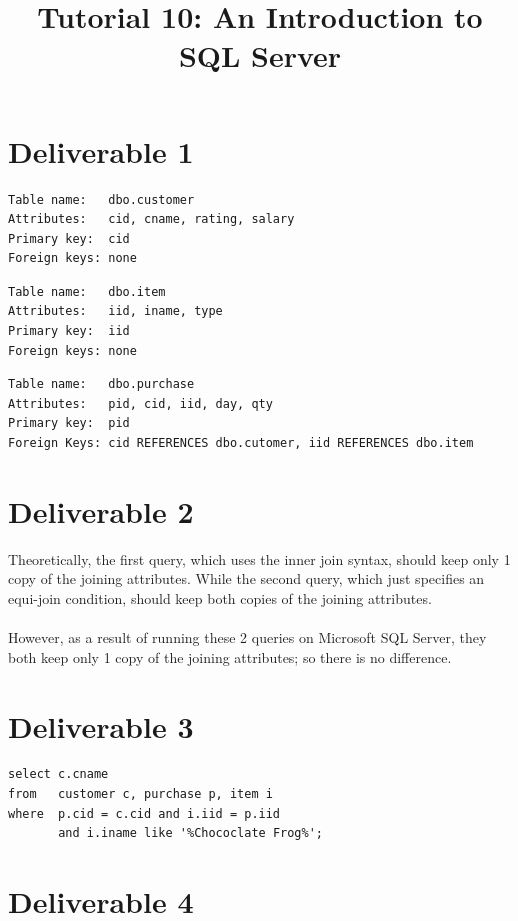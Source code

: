 \documentclass{article}
\title{Tutorial 10: An Introduction to SQL Server}
\begin{document}
	\maketitle

\section{Deliverable 1}

\begin{verbatim}
Table name:   dbo.customer
Attributes:   cid, cname, rating, salary
Primary key:  cid
Foreign keys: none
\end{verbatim}

\begin{verbatim}
Table name:   dbo.item
Attributes:   iid, iname, type
Primary key:  iid
Foreign keys: none
\end{verbatim}

\begin{verbatim}
Table name:   dbo.purchase
Attributes:   pid, cid, iid, day, qty
Primary key:  pid
Foreign Keys: cid REFERENCES dbo.cutomer, iid REFERENCES dbo.item
\end{verbatim}





\section{Deliverable 2}

Theoretically, the first query, which uses the inner join syntax, should keep only 1 copy of the joining attributes. While the second query, which just specifies an equi-join condition, should keep both copies of the joining attributes. \\
\\
\noindent However, as a result of running these 2 queries on Microsoft SQL Server, they both keep only 1
 copy of the joining attributes; so there is no difference.

\section{Deliverable 3}

\begin{verbatim}
select c.cname
from   customer c, purchase p, item i
where  p.cid = c.cid and i.iid = p.iid 
       and i.iname like '%Chococlate Frog%';
\end{verbatim}

\section{Deliverable 4}
\end{document}
